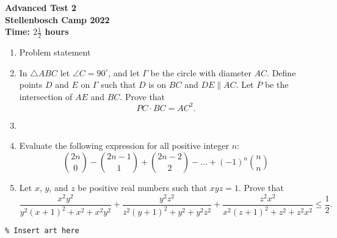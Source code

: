 \documentclass{article}
\begin{document}
\thispagestyle{empty}

\begin{center}
  \textbf{\Large Advanced Test 2}
  \\ \vspace{1em}
  \textbf{\large Stellenbosch Camp 2022}
  \\ \vspace{1em}
  \textbf{\large Time: $2\frac{1}{2}$ hours}
\end{center}

\bigskip

\vfill

\begin{enumerate}[itemsep=\fill]

\item %
Problem statement


\item %
In $\triangle ABC$ let $\angle C = 90^\circ$, and let $\Gamma$ be the circle with diameter $AC$. Define points $D$ and $E$ on $\Gamma$ such that $D$ is on $BC$ and $DE \parallel AC$. Let $P$ be the intersection of $AE$ and $BC$. Prove that
\[ PC \cdot BC = AC^2. \]

\vspace{0pt}


\item %


\item %
Evaluate the following expression for all positive integer $n$:
\[ {2n \choose 0} -{2n-1 \choose 1}+{2n-2 \choose 2}-...+(-1)^n{n \choose n} \]

\vspace{0pt}


\item %
Let $x$, $y$, and $z$ be positive real numbers such that $xyz = 1$.
Prove that
\[ \frac{x^2y^2}{y^2(x+1)^2+x^2+x^2y^2} +\frac{y^2z^2}{z^2(y+1)^2+y^2+y^2z^2} +\frac{z^2x^2}{x^2(z+1)^2+z^2+z^2x^2} \leq \frac{1}{2}. \]

\end{enumerate}


\vfill
\centering
\small
\begin{BVerbatim}
\end{BVerbatim}
\end{document}
